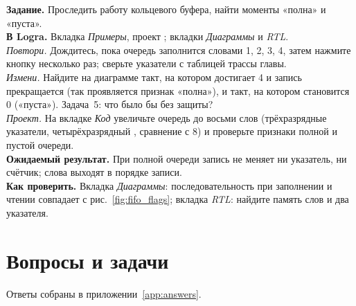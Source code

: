 \begin{diybox}
\textbf{Задание.} Проследить работу кольцевого буфера, найти моменты
«полна» и «пуста».\\
\textbf{В Logra.} Вкладка \emph{Примеры}, проект ;
вкладки \emph{Диаграммы} и \emph{RTL}.\\
 \emph{Повтори.} Дождитесь, пока очередь заполнится словами
1, 2, 3, 4, затем нажмите кнопку несколько раз; сверьте указатели с таблицей
трассы главы.\\
 \emph{Измени.} Найдите на диаграмме такт, на котором 
достигает 4 и запись прекращается (так проявляется признак «полна»), и такт,
на котором  становится 0 («пуста»). Задача~5: что было бы без
защиты?\\
 \emph{Проект.} На вкладке \emph{Код} увеличьте очередь до восьми
слов (трёхразрядные указатели, четырёхразрядный , сравнение с 8) и
проверьте признаки полной и пустой очереди.\\
\textbf{Ожидаемый результат.} При полной очереди запись не меняет ни
указатель, ни счётчик; слова выходят в порядке записи.\\
\textbf{Как проверить.} Вкладка \emph{Диаграммы}: последовательность
 при заполнении и чтении совпадает с рис.~\ref{fig:fifo_flags};
вкладка \emph{RTL}: найдите память слов и два указателя.
\end{diybox}

\section{Вопросы и задачи}
\label{sec:tasks-fsmdesign}

Ответы собраны в приложении~\ref{app:answers}.

